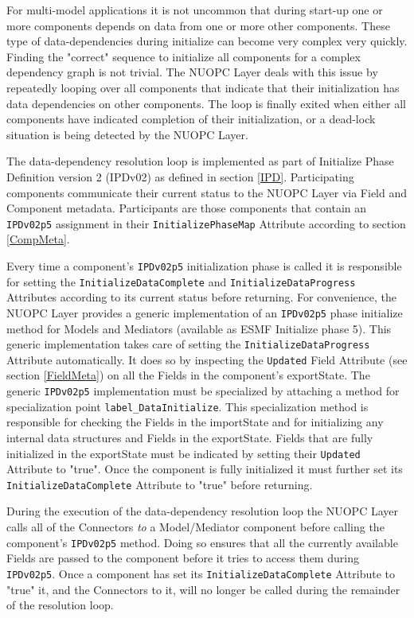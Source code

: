 %

\label{DataDepInit}

For multi-model applications it is not uncommon that during start-up one or more components depends on data from one or more other components. These type of data-dependencies during initialize can become very complex very quickly. Finding the "correct" sequence to initialize all components for a complex dependency graph is not trivial. The NUOPC Layer deals with this issue by repeatedly looping over all components that indicate that their initialization has data dependencies on other components. The loop is finally exited when either all components have indicated completion of their initialization, or a dead-lock situation is being detected by the NUOPC Layer.

The data-dependency resolution loop is implemented as part of Initialize Phase Definition version 2 (IPDv02) as defined in section \ref{IPD}. Participating components communicate their current status to the NUOPC Layer via Field and Component metadata. Participants are those components that contain an {\tt IPDv02p5} assignment in their {\tt InitializePhaseMap} Attribute according to section \ref{CompMeta}.  

Every time a component's {\tt IPDv02p5} initialization phase is called it is responsible for setting the {\tt InitializeDataComplete} and {\tt InitializeDataProgress} Attributes according to its current status before returning. For convenience, the NUOPC Layer provides a generic implementation of an {\tt IPDv02p5} phase initialize method for Models and Mediators (available as ESMF Initialize phase 5). This generic implementation takes care of setting the {\tt InitializeDataProgress} Attribute automatically. It does so by inspecting the {\tt Updated} Field Attribute (see section \ref{FieldMeta}) on all the Fields in the component's exportState. The generic {\tt IPDv02p5} implementation must be specialized by attaching a method for specialization point {\tt label\_DataInitialize}. This specialization method is responsible for checking the Fields in the importState and for initializing any internal data structures and Fields in the exportState. Fields that are fully initialized in the exportState must be indicated by setting their {\tt Updated} Attribute to "true". Once the component is fully initialized it must further set its {\tt InitializeDataComplete} Attribute to "true" before returning.

During the execution of the data-dependency resolution loop the NUOPC Layer calls all of the Connectors {\em to} a Model/Mediator component before calling the component's {\tt IPDv02p5} method. Doing so ensures that all the currently available Fields are passed to the component before it tries to access them during {\tt IPDv02p5}. Once a component has set its {\tt InitializeDataComplete} Attribute to "true" it, and the Connectors to it, will no longer be called during the remainder of the resolution loop. 

